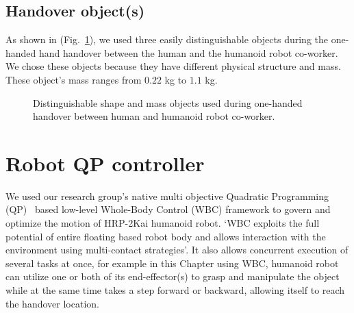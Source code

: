 \subsection{Handover object(s)}

As shown in (Fig.~\ref{fig:objects}), we used three easily distinguishable objects during the one-handed hand handover between the human and the humanoid robot co-worker. We chose these objects because they have different physical structure and mass. These object's mass ranges from $0.22$ kg to $1.1$ kg.


\begin{figure}[pb]
	\caption{Distinguishable shape and mass objects used during one-handed handover between human and humanoid robot co-worker.}
	\label{fig:objects}
\end{figure}


\clearpage

\section{Robot QP controller}\label{QPController}

We used our research group's native multi objective Quadratic Programming (QP)~\cite{ladder-HRP-2Kai} based low-level Whole-Body Control (WBC) framework to govern and optimize the motion of HRP-2Kai humanoid robot. `WBC exploits the full potential of entire floating based robot body and allows interaction with the environment using multi-contact strategies'. It also allows concurrent execution of several tasks at once, for example in this Chapter using WBC, humanoid robot can utilize one or both of its end-effector(s) to grasp and manipulate the object while at the same time takes a step forward or backward, allowing itself to reach the handover location. 

